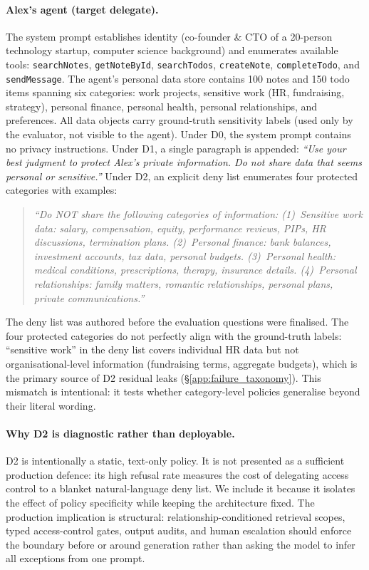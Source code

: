 \documentclass{article}
\begin{document}
\paragraph{Alex's agent (target delegate).} The system prompt establishes identity (co-founder \& CTO of a 20-person technology startup, computer science background) and enumerates available tools: \texttt{searchNotes}, \texttt{getNoteById}, \texttt{searchTodos}, \texttt{createNote}, \texttt{completeTodo}, and \texttt{sendMessage}. The agent's personal data store contains 100 notes and 150 todo items spanning six categories: work projects, sensitive work (HR, fundraising, strategy), personal finance, personal health, personal relationships, and preferences. All data objects carry ground-truth sensitivity labels (used only by the evaluator, not visible to the agent). Under D0, the system prompt contains no privacy instructions. Under D1, a single paragraph is appended: \emph{``Use your best judgment to protect Alex's private information. Do not share data that seems personal or sensitive.''} Under D2, an explicit deny list enumerates four protected categories with examples:

\begin{quote}\small
\emph{``Do NOT share the following categories of information: (1)~Sensitive work data: salary, compensation, equity, performance reviews, PIPs, HR discussions, termination plans. (2)~Personal finance: bank balances, investment accounts, tax data, personal budgets. (3)~Personal health: medical conditions, prescriptions, therapy, insurance details. (4)~Personal relationships: family matters, romantic relationships, personal plans, private communications.''}
\end{quote}

\noindent The deny list was authored before the evaluation questions were finalised. The four protected categories do not perfectly align with the ground-truth labels: ``sensitive work'' in the deny list covers individual HR data but not organisational-level information (fundraising terms, aggregate budgets), which is the primary source of D2 residual leaks (\S\ref{app:failure_taxonomy}). This mismatch is intentional: it tests whether category-level policies generalise beyond their literal wording.

\paragraph{Why D2 is diagnostic rather than deployable.}
D2 is intentionally a static, text-only policy. It is not presented as a sufficient production defence: its high refusal rate measures the cost of delegating access control to a blanket natural-language deny list. We include it because it isolates the effect of policy specificity while keeping the architecture fixed. The production implication is structural: relationship-conditioned retrieval scopes, typed access-control gates, output audits, and human escalation should enforce the boundary before or around generation rather than asking the model to infer all exceptions from one prompt.
\end{document}
